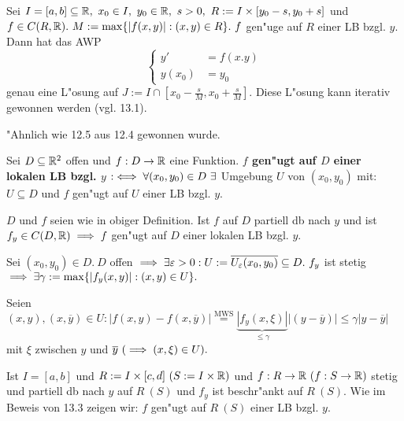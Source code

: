 \documentclass[a4paper,twoside,DIV15,BCOR12mm]{scrbook}
\begin{document}
\begin{satz}
Sei $I=[a,b]\subseteq \mathbb{R},\ x_0\in I,\ y_0 \in \mathbb{R},\ s>0,\ R:=I\times[y_0-s,y_0+s]$ und $f\in C(R,\MdR).\ M:=\max\{|f(x,y)|:(x,y)\in R\}.\ f$ gen"uge auf $R$ einer LB bzgl. $y$. Dann hat das AWP
$$\begin{cases}
y'     & =f(x.y)\\
y(x_0) & =y_0
\end{cases}$$
genau eine L"osung auf $J:=I\cap [x_0-\frac{s}{M}, x_0+\frac{s}{M}].$ Diese L"osung kann iterativ gewonnen werden (vgl. 13.1).
\end{satz}

\begin{beweis}
"Ahnlich wie 12.5 aus 12.4 gewonnen wurde.
\end{beweis}

\begin{definition}
Sei $D\subseteq \mathbb{R}^2$ offen und $f:D\to\mathbb{R}$ eine Funktion. \textbf{$f$ gen"ugt auf $D$ einer lokalen LB bzgl. $y$} $:\equizu \forall (x_0,y_0)\in D\ \exists $ Umgebung $U$ von $(x_0,y_0)$ mit: $U\subseteq D$ und $f$ gen"ugt auf $U$ einer LB bzgl. $y$.
\end{definition}

\begin{satz}
$D$ und $f$ seien wie in obiger Definition. Ist $f$ auf $D$ partiell db nach $y$ und ist $f_y\in C(D,\mathbb{R}) \implies f$ gen"ugt auf $D$ einer lokalen LB bzgl. $y$.
\end{satz}

\begin{beweis}
Sei $(x_0,y_0) \in D.\ D$ offen $\implies \exists \varepsilon>0: U:=\overline{U_\varepsilon(x_0,y_0)}\subseteq D.\ f_y$ ist stetig $\implies \exists \gamma:=\max\{|f_y(x,y)|:(x,y)\in U\}.$

Seien $(x,y),(x,\overline{y})\in U: |f(x,y)-f(x,\overline{y})| \overset{\text{MWS}}{=} \underbrace{|f_y(x,\xi)|}_{\le \gamma}|(y-\overline{y})| \le \gamma |y-\overline{y}|$ mit $\xi$ zwischen $y$ und $\overline{y}\ (\implies (x,\xi)\in U).$
\end{beweis}

\begin{bemerkung}
Ist $I=[a,b]$ und $R:=I\times[c,d]\ (S:=I\times\mathbb{R})$ und $f:R\to\mathbb{R}\ (f:S\to\mathbb{R})$ stetig und partiell db nach $y$ auf $R\ (S)$ und $f_y$ ist beschr"ankt auf $R\ (S)$. Wie im Beweis von 13.3 zeigen wir: $f$ gen"ugt auf $R\ (S)$ einer LB bzgl. $y$.
\end{bemerkung}
\end{document}
